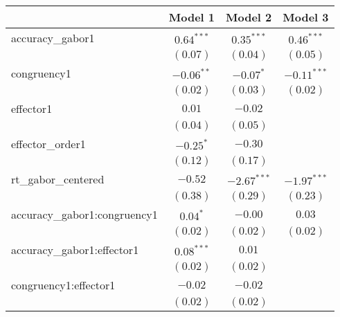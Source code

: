 
\usepackage{booktabs}

\begin{table}
\begin{center}
\begin{tabular}{l c c c}
\toprule
 & Model 1 & Model 2 & Model 3 \\
\midrule
accuracy\_gabor1                                          & $0.64^{***}$ & $0.35^{***}$  & $0.46^{***}$  \\
                                                          & $(0.07)$     & $(0.04)$      & $(0.05)$      \\
congruency1                                               & $-0.06^{**}$ & $-0.07^{*}$   & $-0.11^{***}$ \\
                                                          & $(0.02)$     & $(0.03)$      & $(0.02)$      \\
effector1                                                 & $0.01$       & $-0.02$       &               \\
                                                          & $(0.04)$     & $(0.05)$      &               \\
effector\_order1                                          & $-0.25^{*}$  & $-0.30$       &               \\
                                                          & $(0.12)$     & $(0.17)$      &               \\
rt\_gabor\_centered                                       & $-0.52$      & $-2.67^{***}$ & $-1.97^{***}$ \\
                                                          & $(0.38)$     & $(0.29)$      & $(0.23)$      \\
accuracy\_gabor1:congruency1                              & $0.04^{*}$   & $-0.00$       & $0.03$        \\
                                                          & $(0.02)$     & $(0.02)$      & $(0.02)$      \\
accuracy\_gabor1:effector1                                & $0.08^{***}$ & $0.01$        &               \\
                                                          & $(0.02)$     & $(0.02)$      &               \\
congruency1:effector1                                     & $-0.02$      & $-0.02$       &               \\
                                                          & $(0.02)$     & $(0.02)$      &               \\

\end{tabular}
\end{center}
\end{table}
